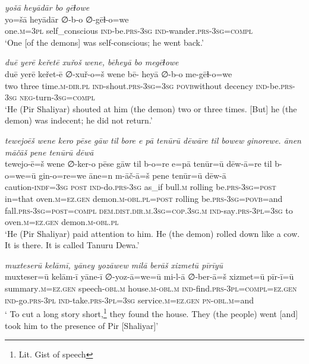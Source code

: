 \ea \label{ŽP.180}
\textit{yošā heyādār bo gēɫowe} \\ 
\gll yo=šā heyādār ∅-b-o ∅-gēɫ-o=we \\ 
 one\textsc{.m}\textsc{=3pl} self\_conscious \textsc{ind-}be\textsc{.prs}\textsc{-3sg} \textsc{ind-}wander\textsc{.prs}\textsc{-3sg}\textsc{=compl} \\ 
\glt `One [of the demons] was self-conscious; he went back.'
\z 
 
\ea \label{ŽP.194}
\textit{duē yerē keřetē xuřoš wene, bēheyā bo megēɫowe} \\ 
\gll duē yerē keřet-ē ∅-xuř-o=š wene bē- heyā ∅-b-o me-gēɫ-o=we \\ 
 two three time\textsc{.m}\textsc{-dir}\textsc{.pl} \textsc{ind-}shout\textsc{.prs}\textsc{-3sg}\textsc{=3sg} \textsc{povb}without decency \textsc{ind-}be\textsc{.prs}\textsc{-3sg} \textsc{neg-}turn\textsc{-3sg}\textsc{=compl} \\ 
\glt `He (Pir Shaliyar) shouted at him (the demon) two or three times. [But] he (the demon) was indecent; he did not return.'
\z 
 
\ea \label{ŽP.200}
\textit{tewejoēš wene kero pēse gāw til bore e pā tenūrū dēwāre til bowew ginorewe. ānen māčāš pene tenūrū dēwā} \\ 
\gll tewejo-ē=š wene ∅-ker-o pēse gāw til b-o=re e=pā tenūr=ū dēw-ā=re til b-o=we=ū gin-o=re=we āne=n m-āč-ā=š pene tenūr=ū dēw-ā \\ 
 caution\textsc{-indf}\textsc{=3sg} \textsc{post} \textsc{ind-}do\textsc{.prs}\textsc{-3sg} as\_if bull\textsc{.m} rolling be\textsc{.prs}\textsc{-3sg}\textsc{=\textsc{post}} in=that oven\textsc{.m}\textsc{\textsc{=ez.gen}} demon\textsc{.m}\textsc{-obl}\textsc{.pl}\textsc{=\textsc{post}} rolling be\textsc{.prs}\textsc{-3sg}\textsc{=\textsc{povb}}=and fall\textsc{.prs}\textsc{-3sg}\textsc{=\textsc{post}}\textsc{=compl} \textsc{dem.dist}\textsc{.dir}\textsc{.m}\textsc{.3sg}\textsc{=cop}\textsc{.3sg}\textsc{.m} \textsc{ind-}say\textsc{.prs}\textsc{-3pl}\textsc{=3sg} to oven\textsc{.m}\textsc{\textsc{=ez.gen}} demon\textsc{.m}\textsc{-obl}\textsc{.pl} \\ 
\glt `He (Pir Shaliyar) paid attention to him. He (the demon) rolled down like a cow. It is there. It is called Tanuru Dewa.'
\z 
 
\ea \label{ŽP.205}
\textit{muxteserū kelāmī, yāney yozāwew milā berāš xizmetū pīrīyū} \\ 
\gll muxteser=ū kelām-ī yāne-ī ∅-yoz-ā=we=ū mi-l-ā ∅-ber-ā=š xizmet=ū pīr-ī=ū \\ 
 summary\textsc{.m}\textsc{\textsc{=ez.gen}} speech\textsc{-obl}\textsc{.m} house\textsc{.m}\textsc{-obl}\textsc{.m} \textsc{ind-}find\textsc{.prs}\textsc{-3pl}\textsc{=compl}\textsc{\textsc{=ez.gen}} \textsc{ind-}go\textsc{.prs}\textsc{-3pl} \textsc{ind-}take\textsc{.prs}\textsc{-3pl}\textsc{=3sg} service\textsc{.m}\textsc{\textsc{=ez.gen}} \textsc{pn}\textsc{-obl}\textsc{.m}=and \\ 
\glt ` To cut a long story short,\footnote{Lit. Gist of speech} they found the house. They (the people) went [and] took him to the presence of Pir [Shaliyar]'
\z 
 
